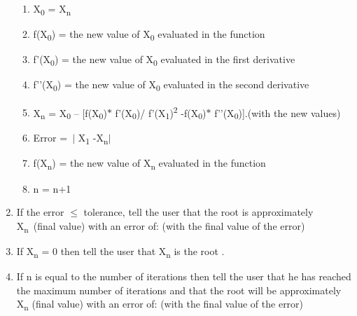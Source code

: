 \documentclass[12pt]{article}
\renewcommand{\_}{\kern-1.5pt\textunderscore\kern-1.5pt}
\begin{document}
\begin{enumerate}
\begin{enumerate}
	\item X\textsubscript{0 }= X\textsubscript{n }\par

	\item f(X\textsubscript{0}) = the new value of X\textsubscript{0 }evaluated in the function \par

	\item f’(X\textsubscript{0}) = the new value of X\textsubscript{0 }evaluated in the first derivative \par

	\item f’’(X\textsubscript{0}) = the new value of X\textsubscript{0 }evaluated in the second derivative \par

	\item X\textsubscript{n }= X\textsubscript{0 }– [f(X\textsubscript{0})$\ast$ f’(X\textsubscript{0})/ f’(X\textsubscript{1})\textsuperscript{2 }-f(X\textsubscript{0})$\ast$ f’’(X\textsubscript{0})].(with the new values)\par

	\item Error =\  $ \vert $ X\textsubscript{1 }-X\textsubscript{n}$ \vert $ \par

	\item f(X\textsubscript{n}) = the new value of X\textsubscript{n} evaluated in the function \par

	\item n = n+1 \par


\end{enumerate}
	\item If the error $ \leq $  tolerance, tell the user that the root is approximately X\textsubscript{n}\ (final value) with an error of: \_\_\_\_ (with the final value of the error)\par

	\item If X\textsubscript{n }= 0 then tell the user that X\textsubscript{n }is the root . \par

	\item If n is equal to the number of iterations then tell the user that he has reached the maximum number of iterations and that the root will be approximately X\textsubscript{n }(final value) with an error of: \_\_\_\_(with the final value of the error) 
\end{enumerate}\par


\printbibliography
\end{document}
